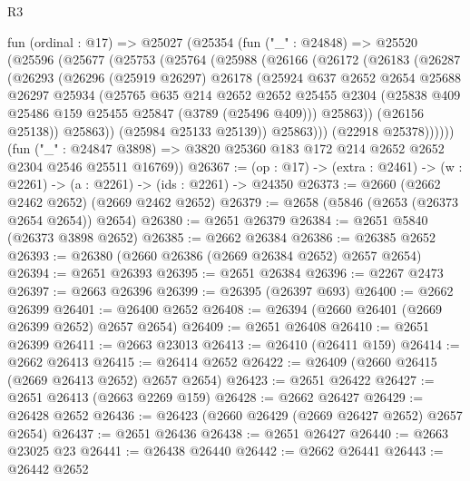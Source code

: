 \begin{lexlean}{R3}
\begin{coremodule}
  fun (ordinal : @17) =>
  @25027
    (@25354
      (fun ("_" : @24848) =>
      @25520
        (@25596
          (@25677
            (@25753
              (@25764
                (@25988
                  (@26166
                    (@26172
                      (@26183
                        (@26287
                          (@26293
                            (@26296
                              (@25919 @26297)
                              @26178
                              (@25924
                                @637
                                @2652
                                @2654
                                @25688
                                @26297
                                @25934
                                (@25765
                                  @635
                                  @214
                                  @2652
                                  @2652
                                  @25455
                                  @2304
                                  (@25838 @409 @25486 @159 @25455 @25847 (@3789 (@25496 @409)))
                                  @25863))
                              (@26156 @25138))
                            @25863))
                        (@25984 @25133 @25139))
                      @25863)))
                (@22918 @25378))))))
      (fun ("_" : @24847 @3898) =>
      @3820 @25360 @183 @172 @214 @2652 @2652 @2304 @2546 @25511 @16769))
@26367 := (op : @17) -> (extra : @2461) -> (w : @2261) -> (a : @2261) -> (ids : @2261) -> @24350
@26373 := @2660 (@2662 @2462 @2652) (@2669 @2462 @2652)
@26379 := @2658 (@5846 (@2653 (@26373 @2654 @2654)) @2654)
@26380 := @2651 @26379
@26384 := @2651 @5840 (@26373 @3898 @2652)
@26385 := @2662 @26384
@26386 := @26385 @2652
@26393 := @26380 (@2660 @26386 (@2669 @26384 @2652) @2657 @2654)
@26394 := @2651 @26393
@26395 := @2651 @26384
@26396 := @2267 @2473
@26397 := @2663 @26396
@26399 := @26395 (@26397 @693)
@26400 := @2662 @26399
@26401 := @26400 @2652
@26408 := @26394 (@2660 @26401 (@2669 @26399 @2652) @2657 @2654)
@26409 := @2651 @26408
@26410 := @2651 @26399
@26411 := @2663 @23013
@26413 := @26410 (@26411 @159)
@26414 := @2662 @26413
@26415 := @26414 @2652
@26422 := @26409 (@2660 @26415 (@2669 @26413 @2652) @2657 @2654)
@26423 := @2651 @26422
@26427 := @2651 @26413 (@2663 @2269 @159)
@26428 := @2662 @26427
@26429 := @26428 @2652
@26436 := @26423 (@2660 @26429 (@2669 @26427 @2652) @2657 @2654)
@26437 := @2651 @26436
@26438 := @2651 @26427
@26440 := @2663 @23025 @23
@26441 := @26438 @26440
@26442 := @2662 @26441
@26443 := @26442 @2652

\end{coremodule}
\end{lexlean}
